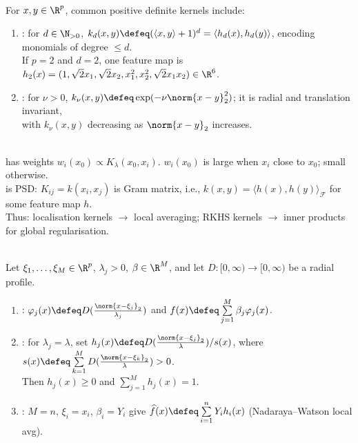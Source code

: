 \begin{example} \label{ex:sl-common-kernels} \\
For $x,y\in\R^p$, common positive definite kernels include:
\begin{enumerate}[label=(\roman*)]
\setlength{\itemsep}{0pt}
\item {}: for $d\in\N_{>0}$, $k_d(x,y)\defeq(\langle x,y\rangle+1)^d=\langle h_d(x),h_d(y)\rangle$, encoding monomials of degree $\leq d$.\\
If $p=2$ and $d=2$, one feature map is $h_2(x)=(1,\sqrt{2}x_1,\sqrt{2}x_2,x_1^2,x_2^2,\sqrt{2}x_1x_2)\in\R^6$.
\item {}: for $\nu>0$, $k_\nu(x,y)\defeq\exp(-\nu\norm{x-y}_2^2)$; it is radial and translation invariant,\\
with $k_\nu(x,y)$ decreasing as $\norm{x-y}_2$ increases.
\end{enumerate}
\end{example}

\begin{remark} \label{rem:sl-localization-kernels-versus-rkhs-kernels} \\
 has weights $w_i(x_0)\propto K_\lambda(x_0,x_i)$. $w_i(x_0)$ is large when $x_i$ close to $x_0$; small otherwise.\\
 is PSD: $K_{ij}=k(x_i,x_j)$ is Gram matrix, i.e., $k(x,y)=\langle h(x),h(y)\rangle_{\mathcal{F}}$ for some feature map $h$.\\
Thus: localisation kernels $\to$ local averaging; RKHS kernels $\to$ inner products for global regularisation.
\end{remark}

\begin{example} \label{ex:sl-radial-basis-expansion} \\
Let $\xi_1,\ldots,\xi_M\in\R^p$, $\lambda_j>0$, $\beta\in\R^M$, and let $D:[0,\infty)\to[0,\infty)$ be a radial profile.
\begin{enumerate}[label=(\roman*)]
\setlength{\itemsep}{0pt}
\item {}: $\varphi_j(x)\defeq D(\frac{\norm{x-\xi_j}_2}{\lambda_j})$ and $f(x)\defeq\sum\limits_{j=1}^M\beta_j\varphi_j(x)$.
\item {}: for $\lambda_j=\lambda$, set $h_j(x)\defeq D(\frac{\norm{x-\xi_j}_2}{\lambda})/s(x)$, where $s(x)\defeq\sum\limits_{k=1}^M D(\frac{\norm{x-\xi_k}_2}{\lambda})>0$.\\
Then $h_j(x)\geq0$ and $\sum\limits_{j=1}^M h_j(x)=1$.
\item {}: $M=n$, $\xi_i=x_i$, $\beta_i=Y_i$ give $\widehat{f}(x)\defeq\sum\limits_{i=1}^nY_i h_i(x)$ (Nadaraya--Watson local avg).
\end{enumerate}
\end{example}


